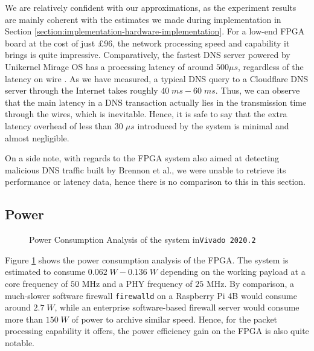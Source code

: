 \documentclass[a4paper]{report}
\newcommand{\code}{\texttt}
\begin{document}
We are relatively confident with our approximations, as the experiment results are mainly coherent with the estimates we made during implementation in Section \ref{section:implementation-hardware-implementation}. For a low-end FPGA board at the cost of just $£96$, the network processing speed and capability it brings is quite impressive. Comparatively, the fastest DNS server powered by Unikernel Mirage OS has a processing latency of around $500 \mu s$, regardless of the latency on wire \cite{briggs-2014, madhavapeddy-2013}.  As we have measured, a typical DNS query to a Cloudflare DNS server through the Internet takes roughly $40\;ms - 60\;ms$. Thus, we can observe that the main latency in a DNS transaction actually lies in the transmission time through the wires, which is inevitable. Hence, it is safe to say that the extra latency overhead of less than $30\; \mu s$ introduced by the system is minimal and almost negligible.

On a side note, with regards to the FPGA system also aimed at detecting malicious DNS traffic built by Brennon et al.\cite{thomas-2011}, we were unable to retrieve its performance or latency data, hence there is no comparison to this in this section.

\subsection{Power}

\begin{figure}[h!]
  \caption{Power Consumption Analysis of the system in\code{Vivado 2020.2}}
  \label{fig:power-consumption-analysis}
\end{figure}

Figure \ref{fig:power-consumption-analysis} shows the power consumption analysis of the FPGA. The system is estimated to consume $0.062\;W - 0.136\;W$ depending on the working payload at a core frequency of $50$ MHz and a PHY frequency of $25$ MHz. By comparison, a much-slower software firewall \code{firewalld} on a Raspberry Pi 4B would consume around $2.7 \; W$, while an enterprise software-based firewall server would consume more than $150 \; W$ of power to archive similar speed. Hence, for the packet processing capability it offers, the power efficiency gain on the FPGA is also quite notable.
\end{document}
